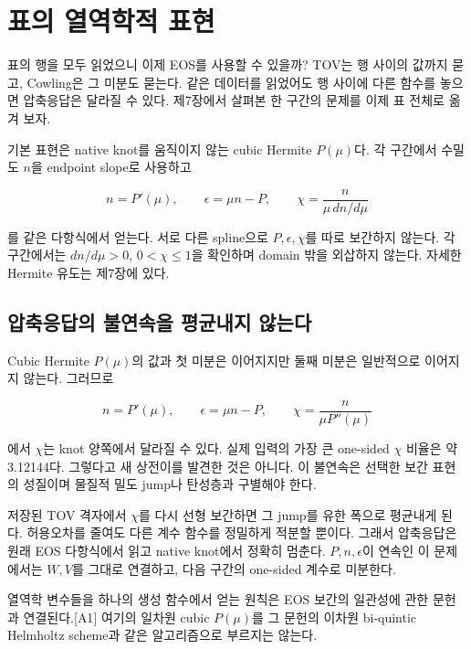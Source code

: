\documentclass[
  10pt,
  a4paper,
]{article}
\begin{document}

\section{표의 열역학적
표현}\label{uxd45cuxc758-uxc5f4uxc5eduxd559uxc801-uxd45cuxd604}

표의 행을 모두 읽었으니 이제 EOS를 사용할 수 있을까? TOV는 행 사이의
값까지 묻고, Cowling은 그 미분도 묻는다. 같은 데이터를 읽었어도 행
사이에 다른 함수를 놓으면 압축응답은 달라질 수 있다. 제7장에서 살펴본 한
구간의 문제를 이제 표 전체로 옮겨 보자.

기본 표현은 native knot를 움직이지 않는 cubic Hermite \(P(\mu)\)다. 각
구간에서 수밀도 \(n\)을 endpoint slope로 사용하고

\[
n=P'(\mu),\qquad \epsilon=\mu n-P,
\qquad \chi=\frac{n}{\mu\,dn/d\mu}
\]

를 같은 다항식에서 얻는다. 서로 다른 spline으로 \(P,\epsilon,\chi\)를
따로 보간하지 않는다. 각 구간에서는 \(dn/d\mu>0\), \(0<\chi\leq1\)을
확인하며 domain 밖을 외삽하지 않는다. 자세한 Hermite 유도는 제7장에
있다.

\subsection{압축응답의 불연속을 평균내지
않는다}\label{uxc555uxcd95uxc751uxb2f5uxc758-uxbd88uxc5f0uxc18duxc744-uxd3c9uxade0uxb0b4uxc9c0-uxc54auxb294uxb2e4}

Cubic Hermite \(P(\mu)\)의 값과 첫 미분은 이어지지만 둘째 미분은
일반적으로 이어지지 않는다. 그러므로

\[
n=P'(\mu),\qquad \epsilon=\mu n-P,\qquad
\chi=\frac{n}{\mu P''(\mu)}
\]

에서 \(\chi\)는 knot 양쪽에서 달라질 수 있다. 실제 입력의 가장 큰
one-sided \(\chi\) 비율은 약 3.12144다. 그렇다고 새 상전이를 발견한 것은
아니다. 이 불연속은 선택한 보간 표현의 성질이며 물질적 밀도 jump나
탄성층과 구별해야 한다.

저장된 TOV 격자에서 \(\chi\)를 다시 선형 보간하면 그 jump를 유한 폭으로
평균내게 된다. 허용오차를 줄여도 다른 계수 함수를 정밀하게 적분할
뿐이다. 그래서 압축응답은 원래 EOS 다항식에서 읽고 native knot에서
정확히 멈춘다. \(P,n,\epsilon\)이 연속인 이 문제에서는 \(W,V\)를 그대로
연결하고, 다음 구간의 one-sided 계수로 미분한다.

열역학 변수들을 하나의 생성 함수에서 얻는 원칙은 EOS 보간의 일관성에
관한 문헌과 연결된다.{[}A1{]} 여기의 일차원 cubic \(P(\mu)\)를 그 문헌의
이차원 bi-quintic Helmholtz scheme과 같은 알고리즘으로 부르지는 않는다.
\end{document}
